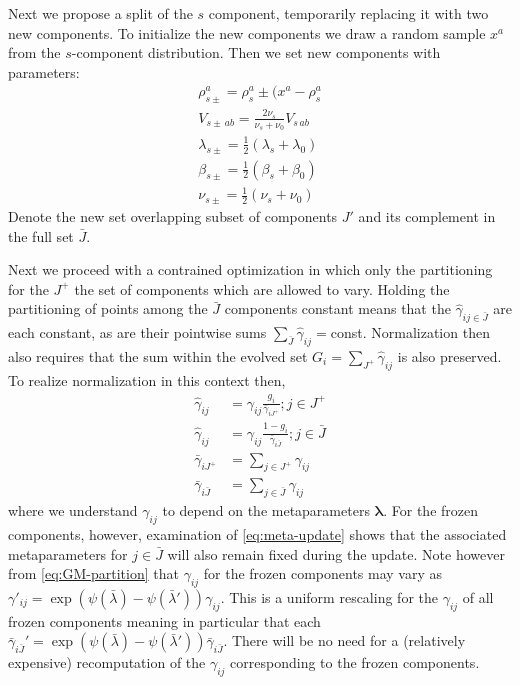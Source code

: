\documentclass[aps,showpacs,twocolumn,prd,superscriptaddress,nofootinbib]{revtex4}
\newcommand{\nn}{\nonumber}
\begin{document}
Next we propose a split of the $s$ component, temporarily replacing it with two new components.  To initialize the new components we draw a random sample $x^a$ from the $s$-component distribution. Then we set new components with parameters:
\begin{align}
  \rho^a_{s\pm}=\rho^a_s\pm(x^a-\rho^a_{s}\nn\\
  V_{s\pm\,ab}=\frac{2\nu_s}{\nu_s+\nu_0}V_{s\,ab}\nn\\
  \lambda_{s\pm}=\frac12(\lambda_s+\lambda_0)\nn\\
  \beta_{s\pm}=\frac12(\beta_s+\beta_0)\nn\\
  \nu_{s\pm}=\frac12(\nu_s+\nu_0)
\end{align}
Denote the new set overlapping subset of components $J'$ and its complement in the full set $\bar J$.

Next we proceed with a contrained optimization in which only the partitioning for the $J^+$
the set of components which are allowed to vary.  Holding the partitioning of points among the $\bar J$ components constant means that the $\hat\gamma_{ij\in \bar J}$ are each constant, as are their pointwise sums $\sum_{\bar J}\hat\gamma_{ij}=$const. Normalization then also requires that the sum within the evolved set $G_i=\sum_{J^+}\hat\gamma_{ij}$ is also preserved.  To realize normalization in this context then,
\begin{align}
  \hat\gamma_{ij}&=\gamma_{ij}\frac{g_i}{\bar\gamma_{iJ^+}};j\in J^+\nn\\
  \hat\gamma_{ij}&=\gamma_{ij}\frac{1-g_i}{\bar\gamma_{i\bar J}};j\in \bar J\nn\\
  \bar\gamma_{iJ^+}&=\sum_{j\in J^+}\gamma_{ij}\nn\\
  \bar\gamma_{i\bar J}&=\sum_{j\in \bar J}\gamma_{ij}\nn
\end{align}
where we understand $\gamma_{ij}$ to depend on the metaparameters $\bm\lambda$.  For the frozen components, however, examination of \eqref{eq:meta-update} shows that the associated metaparameters for $j\in\bar J$ will also remain fixed during the update.  Note however from \eqref{eq:GM-partition} that $\gamma_{ij}$ for the frozen components may vary as $\gamma'_{ij}=\exp(\psi(\bar\lambda)-\psi(\bar\lambda'))\gamma_{ij}$.  This is a uniform rescaling for the $\gamma_{ij}$ of all frozen components meaning in particular that each $\bar\gamma_{i\bar J}'=\exp(\psi(\bar\lambda)-\psi(\bar\lambda'))\bar\gamma_{i\bar J}$. There will be no need for a (relatively expensive) recomputation of the $\gamma_{ij}$ corresponding to the frozen components.
\end{document}
